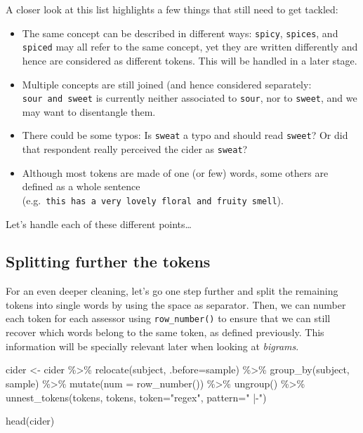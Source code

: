 \documentclass[
]{krantz}
\makeatletter
\newenvironment{Shaded}{\begin{snugshade}}{\end{snugshade}}
\newcommand{\AttributeTok}[1]{\textcolor[rgb]{0.61,0.61,0.61}{#1}}
\newcommand{\FunctionTok}[1]{\textcolor[rgb]{0,0,0}{#1}}
\newcommand{\NormalTok}[1]{#1}
\newcommand{\OtherTok}[1]{\textcolor[rgb]{0.37,0.37,0.37}{#1}}
\newcommand{\SpecialCharTok}[1]{\textcolor[rgb]{0,0,0}{#1}}
\newcommand{\StringTok}[1]{\textcolor[rgb]{0.5,0.5,0.5}{#1}}
\providecommand{\tightlist}{%
  \setlength{\itemsep}{0pt}\setlength{\parskip}{0pt}}
\newenvironment{kframe}{%
\medskip{}
\setlength{\fboxsep}{.8em}
 \def\at@end@of@kframe{}%
 \ifinner\ifhmode%
  \def\at@end@of@kframe{\end{minipage}}%
  \begin{minipage}{\columnwidth}%
 \fi\fi%
 \def\FrameCommand##1{\hskip\@totalleftmargin \hskip-\fboxsep
 \colorbox{shadecolor}{##1}\hskip-\fboxsep
     \hskip-\linewidth \hskip-\@totalleftmargin \hskip\columnwidth}%
 \MakeFramed {\advance\hsize-\width
   \@totalleftmargin\z@ \linewidth\hsize
   \@setminipage}}%
 {\par\unskip\endMakeFramed%
 \at@end@of@kframe}
\renewenvironment{Shaded}{\begin{kframe}}{\end{kframe}}
\makeatother
\begin{document}
A closer look at this list highlights a few things that still need to get tackled:

\begin{itemize}
\tightlist
\item
  The same concept can be described in different ways: \texttt{spicy}, \texttt{spices}, and \texttt{spiced} may all refer to the same concept, yet they are written differently and hence are considered as different tokens. This will be handled in a later stage.
\item
  Multiple concepts are still joined (and hence considered separately: \texttt{sour\ and\ sweet} is currently neither associated to \texttt{sour}, nor to \texttt{sweet}, and we may want to disentangle them.
\item
  There could be some typos: Is \texttt{sweat} a typo and should read \texttt{sweet}? Or did that respondent really perceived the cider as \texttt{sweat}?
\item
  Although most tokens are made of one (or few) words, some others are defined as a whole sentence (e.g.~\texttt{this\ has\ a\ very\ lovely\ floral\ and\ fruity\ smell}).
\end{itemize}

Let's handle each of these different points\ldots{}

\hypertarget{splitting-further-the-tokens}{%
\subsection{Splitting further the tokens}\label{splitting-further-the-tokens}}

For an even deeper cleaning, let's go one step further and split the remaining tokens into single words by using the space as separator. Then, we can number each token for each assessor using \texttt{row\_number()} to ensure that we can still recover which words belong to the same token, as defined previously. This information will be specially relevant later when looking at \emph{bigrams}.

\begin{Shaded}
\begin{Highlighting}[]
\NormalTok{cider }\OtherTok{\textless{}{-}}\NormalTok{ cider }\SpecialCharTok{\%\textgreater{}\%} 
  \FunctionTok{relocate}\NormalTok{(subject, }\AttributeTok{.before=}\NormalTok{sample) }\SpecialCharTok{\%\textgreater{}\%} 
  \FunctionTok{group\_by}\NormalTok{(subject, sample) }\SpecialCharTok{\%\textgreater{}\%} 
  \FunctionTok{mutate}\NormalTok{(}\AttributeTok{num =} \FunctionTok{row\_number}\NormalTok{()) }\SpecialCharTok{\%\textgreater{}\%} 
  \FunctionTok{ungroup}\NormalTok{() }\SpecialCharTok{\%\textgreater{}\%} 
  \FunctionTok{unnest\_tokens}\NormalTok{(tokens, tokens, }\AttributeTok{token=}\StringTok{"regex"}\NormalTok{, }\AttributeTok{pattern=}\StringTok{" |{-}"}\NormalTok{)}

\FunctionTok{head}\NormalTok{(cider)}
\end{Highlighting}
\end{Shaded}
\end{document}
